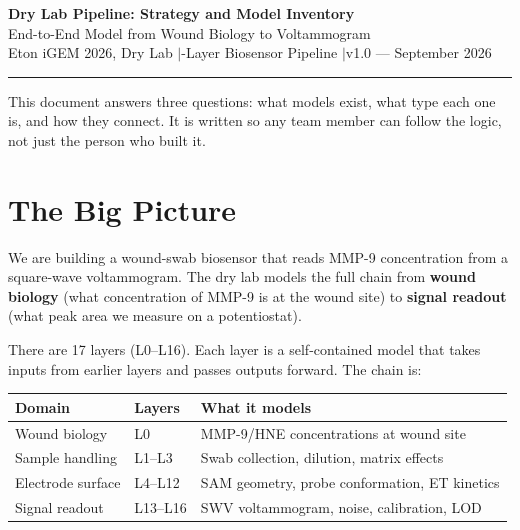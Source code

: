 \documentclass[10pt,a4paper]{article}
\numberwithin{equation}{section}
\begin{document}
\begin{center}
{\LARGE\bfseries Dry Lab Pipeline: Strategy and Model Inventory}\\[0.4em]
{\large End-to-End Model from Wound Biology to Voltammogram}\\[0.25em]
{\small\color{gray} Eton iGEM 2026, Dry Lab \quad$|$-Layer Biosensor Pipeline \quad$|$\quad v1.0 --- September 2026}
\end{center}
\vspace{0.4em}\hrule\vspace{0.7em}

\noindent
This document answers three questions: what models exist, what type each one is,
and how they connect. It is written so any team member can follow the logic,
not just the person who built it.

\section{The Big Picture}

We are building a wound-swab biosensor that reads MMP-9 concentration from a
square-wave voltammogram. The dry lab models the full chain from
\textbf{wound biology} (what concentration of MMP-9 is at the wound site)
to \textbf{signal readout} (what peak area we measure on a potentiostat).

There are 17 layers (L0--L16). Each layer is a self-contained model that takes
inputs from earlier layers and passes outputs forward. The chain is:

\begin{center}
\small
\begin{tabular}{@{}lll@{}}
\toprule
\textbf{Domain} & \textbf{Layers} & \textbf{What it models} \\
\midrule
Wound biology   & L0              & MMP-9/HNE concentrations at wound site \\
Sample handling & L1--L3          & Swab collection, dilution, matrix effects \\
Electrode surface & L4--L12      & SAM geometry, probe conformation, ET kinetics \\
Signal readout  & L13--L16       & SWV voltammogram, noise, calibration, LOD \\
\bottomrule
\end{tabular}
\end{center}
\end{document}
